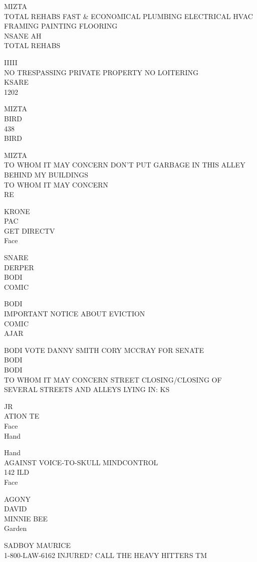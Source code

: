 \documentclass[10pt,letterpaper]{article}
\begin{document}
MIZTA\\
TOTAL REHABS FAST \& ECONOMICAL PLUMBING ELECTRICAL HVAC FRAMING PAINTING FLOORING\\
NSANE AH\\
TOTAL REHABS

IIIII\\
NO TRESPASSING PRIVATE PROPERTY NO LOITERING\\
KSARE\\
1202

MIZTA\\
BIRD\\
438\\
BIRD

MIZTA\\
TO WHOM IT MAY CONCERN DON'T PUT GARBAGE IN THIS ALLEY BEHIND MY BUILDINGS\\
TO WHOM IT MAY CONCERN\\
RE

KRONE\\
PAC\\
GET DIRECTV\\
Face

SNARE\\
DERPER\\
BODI\\
COMIC

BODI\\
IMPORTANT NOTICE ABOUT EVICTION\\
COMIC\\
AJAR

BODI VOTE DANNY SMITH CORY MCCRAY FOR SENATE\\
BODI\\
BODI\\
TO WHOM IT MAY CONCERN STREET CLOSING/CLOSING OF SEVERAL STREETS AND ALLEYS LYING IN: KS

JR\\
ATION TE\\
Face\\
Hand

Hand\\
AGAINST VOICE{-}TO{-}SKULL MINDCONTROL\\
142 ILD\\
Face

AGONY\\
DAVID\\
MINNIE BEE\\
Garden

SADBOY MAURICE\\
1{-}800{-}LAW{-}6162 INJURED?  CALL THE HEAVY HITTERS TM
\end{document}
